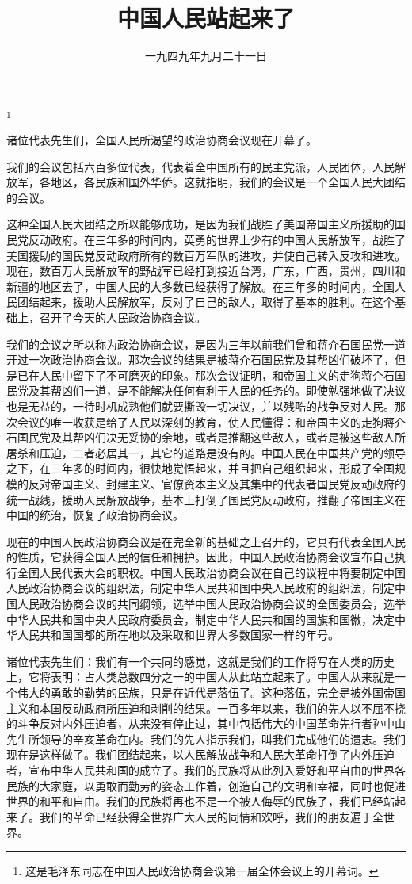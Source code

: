 
\title{中国人民站起来了}
\date{一九四九年九月二十一日}
\thanks{这是毛泽东同志在中国人民政治协商会议第一届全体会议上的开幕词。}
\maketitle


诸位代表先生们，全国人民所渴望的政治协商会议现在开幕了。

我们的会议包括六百多位代表，代表着全中国所有的民主党派，人民团体，人民解放军，各地区，各民族和国外华侨。这就指明，我们的会议是一个全国人民大团结的会议。

这种全国人民大团结之所以能够成功，是因为我们战胜了美国帝国主义所援助的国民党反动政府。在三年多的时间内，英勇的世界上少有的中国人民解放军，战胜了美国援助的国民党反动政府所有的数百万军队的进攻，并使自己转入反攻和进攻。现在，数百万人民解放军的野战军已经打到接近台湾，广东，广西，贵州，四川和新疆的地区去了，中国人民的大多数已经获得了解放。在三年多的时间内，全国人民团结起来，援助人民解放军，反对了自己的敌人，取得了基本的胜利。在这个基础上，召开了今天的人民政治协商会议。

我们的会议之所以称为政治协商会议，是因为三年以前我们曾和蒋介石国民党一道开过一次政治协商会议。那次会议的结果是被蒋介石国民党及其帮凶们破坏了，但是已在人民中留下了不可磨灭的印象。那次会议证明，和帝国主义的走狗蒋介石国民党及其帮凶们一道，是不能解决任何有利于人民的任务的。即使勉强地做了决议也是无益的，一待时机成熟他们就要撕毁一切决议，并以残酷的战争反对人民。那次会议的唯一收获是给了人民以深刻的教育，使人民懂得：和帝国主义的走狗蒋介石国民党及其帮凶们决无妥协的余地，或者是推翻这些敌人，或者是被这些敌人所屠杀和压迫，二者必居其一，其它的道路是没有的。中国人民在中国共产党的领导之下，在三年多的时间内，很快地觉悟起来，并且把自己组织起来，形成了全国规模的反对帝国主义、封建主义、官僚资本主义及其集中的代表者国民党反动政府的统一战线，援助人民解放战争，基本上打倒了国民党反动政府，推翻了帝国主义在中国的统治，恢复了政治协商会议。

现在的中国人民政治协商会议是在完全新的基础之上召开的，它具有代表全国人民的性质，它获得全国人民的信任和拥护。因此，中国人民政治协商会议宣布自己执行全国人民代表大会的职权。中国人民政治协商会议在自己的议程中将要制定中国人民政治协商会议的组织法，制定中华人民共和国中央人民政府的组织法，制定中国人民政治协商会议的共同纲领，选举中国人民政治协商会议的全国委员会，选举中华人民共和国中央人民政府委员会，制定中华人民共和国的国旗和国徽，决定中华人民共和国国都的所在地以及采取和世界大多数国家一样的年号。

诸位代表先生们：我们有一个共同的感觉，这就是我们的工作将写在人类的历史上，它将表明：占人类总数四分之一的中国人从此站立起来了。中国人从来就是一个伟大的勇敢的勤劳的民族，只是在近代是落伍了。这种落伍，完全是被外国帝国主义和本国反动政府所压迫和剥削的结果。一百多年以来，我们的先人以不屈不挠的斗争反对内外压迫者，从来没有停止过，其中包括伟大的中国革命先行者孙中山先生所领导的辛亥革命在内。我们的先人指示我们，叫我们完成他们的遗志。我们现在是这样做了。我们团结起来，以人民解放战争和人民大革命打倒了内外压迫者，宣布中华人民共和国的成立了。我们的民族将从此列入爱好和平自由的世界各民族的大家庭，以勇敢而勤劳的姿态工作着，创造自己的文明和幸福，同时也促进世界的和平和自由。我们的民族将再也不是一个被人侮辱的民族了，我们已经站起来了。我们的革命已经获得全世界广大人民的同情和欢呼，我们的朋友遍于全世界。

